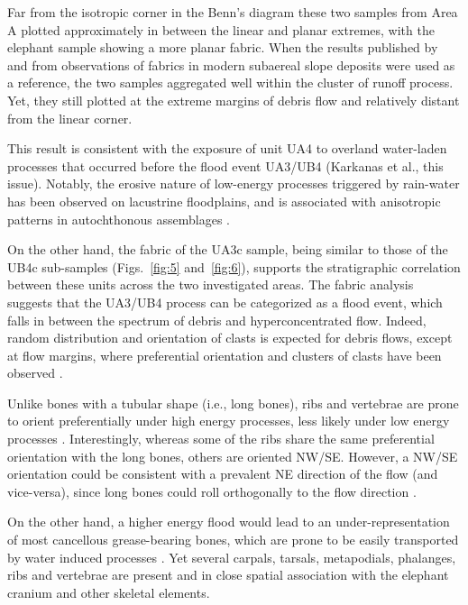 \documentclass[preprint,authoryear,times]{elsarticle} %
\begin{document}
Far from the isotropic corner in the Benn's diagram these two samples from Area A plotted approximately in between the linear and planar extremes, with the elephant sample showing a more planar fabric. When the results published by \cite{Bertran1997} and \cite{Lenoble2004} from observations of fabrics in modern subaereal slope deposits were used as a reference, the two samples aggregated well within the cluster of runoff process. Yet, they still plotted at the extreme margins of debris flow and relatively distant from the linear corner.

This result is consistent with the exposure of unit UA4 to overland water-laden processes that occurred before the flood event UA3/UB4 (Karkanas et al., this issue). Notably, the erosive nature of low-energy processes triggered by rain-water has been observed on lacustrine floodplains, and is associated with anisotropic patterns in autochthonous assemblages \citep{Cobo-Sanchez2014,Dominguez-Rodrigo2014,Garcia-Moreno2016}.

On the other hand, the fabric of the UA3c sample, being similar to those of the UB4c sub-samples (Figs.~\ref{fig:5} and~\ref{fig:6}), supports the stratigraphic correlation between these units across the two investigated areas. The fabric analysis suggests that the UA3/UB4 process can be categorized as a flood event, which falls in between the spectrum of debris and hyperconcentrated flow. Indeed, random distribution and orientation of clasts is expected for debris flows, except at flow margins, where preferential orientation and clusters of clasts have been observed \citep{Pierson2005}. %

Unlike bones with a tubular shape (i.e., long bones), ribs and vertebrae are prone to orient preferentially under high energy processes, less likely under low energy processes \citep{Dominguez-Rodrigo2013,Dominguez-Rodrigo2014}. Interestingly, whereas some of the ribs share the same preferential orientation with the long bones, others are oriented NW/SE. However, a NW/SE orientation could be consistent with a prevalent NE direction of the flow (and vice-versa), since long bones could roll orthogonally to the flow direction \citep{Voorhies1966}.

On the other hand, a higher energy flood would lead to an under-representation of most cancellous grease-bearing bones, which are prone to be easily transported by water induced processes \citep{Voorhies1966}. Yet several carpals, tarsals, metapodials, phalanges, ribs and vertebrae are present and in close spatial association with the elephant cranium and other skeletal elements.
\end{document}
